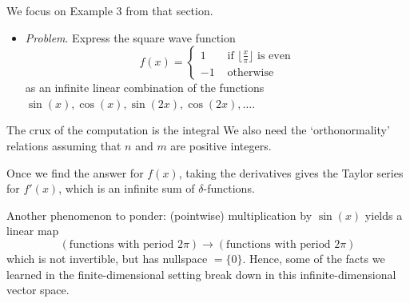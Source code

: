 \documentclass[10pt]{amsart}
\theoremstyle{mythm}
\theoremstyle{definition}
\theoremstyle{myrmk}
\begin{document}
	We focus on Example 3 from that section. 
	\begin{itemize}
		\item \emph{Problem}. Express the square wave function 
		\[
			f(x) = \begin{cases}
				1 & \text{ if } \lfloor \tfrac{x}{\pi} \rfloor \text{ is even} \\
				-1 & \text{ otherwise}
			\end{cases}
		\]
		as an infinite linear combination of the functions $\sin(x), \cos(x), \sin(2x), \cos(2x), \ldots$. 
	\end{itemize}
	The crux of the computation is the integral 
	We also need the `orthonormality' relations 
	assuming that $n$ and $m$ are positive integers. 
	
	Once we find the answer for $f(x)$, taking the derivatives gives the Taylor series for $f'(x)$, which is an infinite sum of $\delta$-functions. 
	
	Another phenomenon to ponder: (pointwise) multiplication by $\sin(x)$ yields a linear map 
	\[
		(\text{functions with period } 2\pi) \to (\text{functions with period } 2\pi)
	\]
	which is not invertible, but has nullspace $= \{0\}$. Hence, some of the facts we learned in the finite-dimensional setting break down in this infinite-dimensional vector space. 
	
	
	
	
	
	
	
	
	
	
	
	
	
	
	
	
\end{document}
